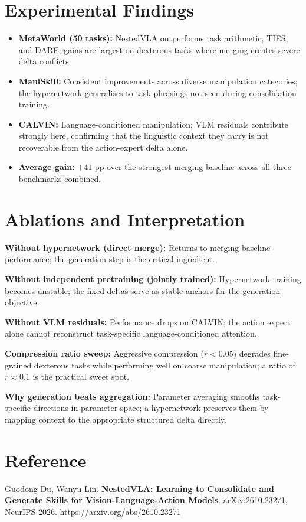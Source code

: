 \documentclass[10pt,twocolumn]{article}
\begin{document}
\section{Experimental Findings}

\begin{itemize}[itemsep=2pt,parsep=0pt]
  \item \textbf{MetaWorld (50 tasks):} NestedVLA outperforms task arithmetic,
    TIES, and DARE; gains are largest on dexterous tasks where merging
    creates severe delta conflicts.
  \item \textbf{ManiSkill:} Consistent improvements across diverse
    manipulation categories; the hypernetwork generalises to task phrasings
    not seen during consolidation training.
  \item \textbf{CALVIN:} Language-conditioned manipulation; VLM residuals
    contribute strongly here, confirming that the linguistic context they
    carry is not recoverable from the action-expert delta alone.
  \item \textbf{Average gain:} $+41$ pp over the strongest merging baseline
    across all three benchmarks combined.
\end{itemize}

\section{Ablations and Interpretation}

\textbf{Without hypernetwork (direct merge):} Returns to merging baseline
performance; the generation step is the critical ingredient.

\textbf{Without independent pretraining (jointly trained):} Hypernetwork
training becomes unstable; the fixed deltas serve as stable anchors for
the generation objective.

\textbf{Without VLM residuals:} Performance drops on CALVIN; the action
expert alone cannot reconstruct task-specific language-conditioned attention.

\textbf{Compression ratio sweep:} Aggressive compression ($r < 0.05$)
degrades fine-grained dexterous tasks while performing well on coarse
manipulation; a ratio of $r \approx 0.1$ is the practical sweet spot.

\textbf{Why generation beats aggregation:} Parameter averaging smooths
task-specific directions in parameter space; a hypernetwork preserves
them by mapping context to the appropriate structured delta directly.

\section*{Reference}

Guodong Du, Wanyu Lin.
\textbf{NestedVLA: Learning to Consolidate and Generate Skills for
Vision-Language-Action Models}.
arXiv:2610.23271, NeurIPS 2026.
\url{https://arxiv.org/abs/2610.23271}
\end{document}
